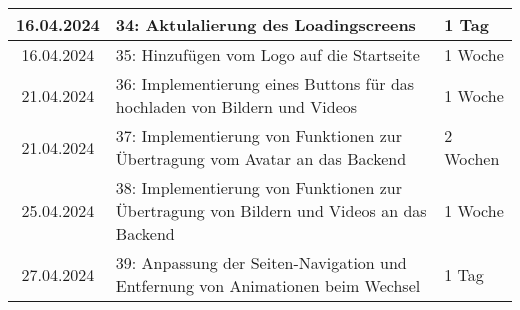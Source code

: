 \begin{table}[h]
{\begin{tabular}{|c|l|l|}
		\hline
        {16.04.2024} & {34: Aktulalierung des Loadingscreens} & {1 Tag} \\
		\hline
        {16.04.2024} & {35: Hinzufügen vom Logo auf die Startseite} & {1 Woche} \\
		\hline
        {21.04.2024} & {36: Implementierung eines Buttons für das hochladen von Bildern und Videos} & {1 Woche} \\
		\hline
        {21.04.2024} & {37: Implementierung von Funktionen zur Übertragung vom Avatar an das Backend} & {2 Wochen} \\
		\hline
        {25.04.2024} & {38: Implementierung von Funktionen zur Übertragung von Bildern und Videos an das Backend} & {1 Woche} \\
		\hline
        {27.04.2024} & {39: Anpassung der Seiten-Navigation und Entfernung von Animationen beim Wechsel} & {1 Tag} \\
		\hline
	\end{tabular}
	}
\end{table}

